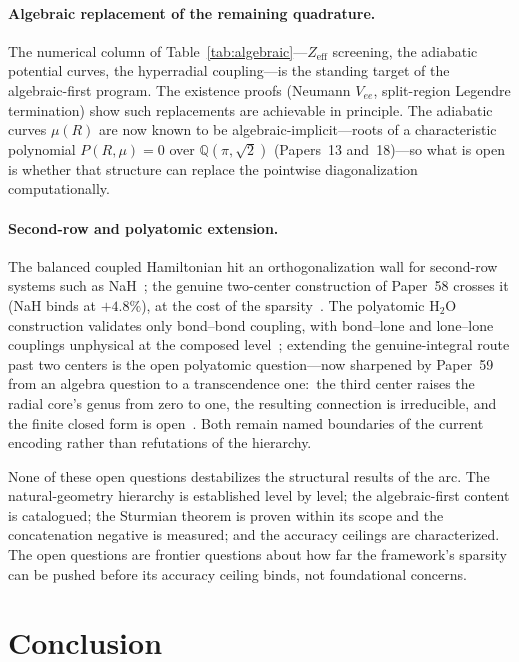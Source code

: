 \documentclass[aps,pra,twocolumn,superscriptaddress,longbibliography]{revtex4-2}
\begin{document}
\paragraph{Algebraic replacement of the remaining quadrature.}  The
numerical column of Table~\ref{tab:algebraic}---$Z_{\mathrm{eff}}$
screening, the adiabatic potential curves, the hyperradial
coupling---is the standing target of the algebraic-first program.  The
existence proofs (Neumann $V_{ee}$, split-region Legendre termination)
show such replacements are achievable in principle.  The adiabatic
curves $\mu(R)$ are now known to be algebraic-implicit---roots of a
characteristic polynomial $P(R,\mu) = 0$ over $\mathbb{Q}(\pi,\sqrt2)$
(Papers~13 and~18)---so what is open is whether that structure can
replace the pointwise diagonalization computationally.

\paragraph{Second-row and polyatomic extension.}  The balanced coupled
Hamiltonian hit an orthogonalization wall for second-row systems such as
NaH~\cite{loutey_paper19}; the genuine two-center construction of
Paper~58 crosses it (NaH binds at $+4.8\%$), at the cost of the
sparsity~\cite{loutey_paper58}.  The polyatomic $\mathrm{H}_2\mathrm{O}$
construction validates only bond--bond coupling, with bond--lone and
lone--lone couplings unphysical at the composed
level~\cite{loutey_paper17}; extending the genuine-integral route past
two centers is the open polyatomic question---now sharpened by Paper~59
from an algebra question to a transcendence one:\ the third center raises
the radial core's genus from zero to one, the resulting connection is irreducible, and
the finite closed form is open~\cite{loutey_paper59}.  Both remain named
boundaries of the current encoding rather than refutations of the
hierarchy.

None of these open questions destabilizes the structural results of the
arc.  The natural-geometry hierarchy is established level by level; the
algebraic-first content is catalogued; the Sturmian theorem is proven
within its scope and the concatenation negative is measured; and the accuracy ceilings are characterized.  The open
questions are frontier questions about how far the framework's
sparsity can be pushed before its accuracy ceiling binds, not
foundational concerns.

\section{Conclusion}
\label{sec:conclusion}
\end{document}
